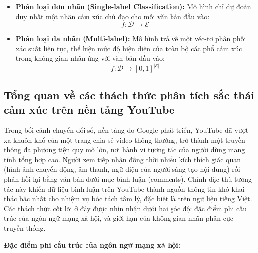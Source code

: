 \begin{itemize}
    \item \textbf{Phân loại đơn nhãn (Single-label Classification):} Mô hình chỉ dự đoán duy nhất một nhãn cảm xúc chủ đạo cho mỗi văn bản đầu vào:
    \begin{equation}
        f: \mathcal{D} \rightarrow \mathcal{E}
    \end{equation}

    \item \textbf{Phân loại đa nhãn (Multi-label):} Mô hình trả về một véc-tơ phân phối xác suất liên tục, thể hiện mức độ hiện diện của toàn bộ các phổ cảm xúc trong không gian nhãn ứng với văn bản đầu vào:
    \begin{equation}
        f: \mathcal{D} \rightarrow [0, 1]^{|\mathcal{E}|}
    \end{equation}
\end{itemize}

\subsection{Tổng quan về các thách thức phân tích sắc thái cảm xúc trên nền tảng YouTube}
Trong bối cảnh chuyển đổi số, nền tảng do Google phát triển, YouTube đã vượt xa khuôn khổ của một trang chia sẻ video thông thường, trở thành một truyền thông đa phương tiện quy mô lớn, nơi hành vi tương tác của người dùng mang tính tổng hợp cao. Người xem tiếp nhận đồng thời nhiều kích thích giác quan (hình ảnh chuyển động, âm thanh, ngữ điệu của người sáng tạo nội dung) rồi phản hồi lại bằng văn bản dưới mục bình luận (comments). Chính đặc thù tương tác này khiến dữ liệu bình luận trên YouTube thành nguồn thông tin khó khai thác bậc nhất cho nhiệm vụ bóc tách tâm lý, đặc biệt là trên ngữ liệu tiếng Việt. Các thách thức cốt lõi ở đây được nhìn nhận dưới hai góc độ: đặc điểm phi cấu trúc của ngôn ngữ mạng xã hội, và giới hạn của không gian nhãn phân cực truyền thống.

\textbf{Đặc điểm phi cấu trúc của ngôn ngữ mạng xã hội:}

